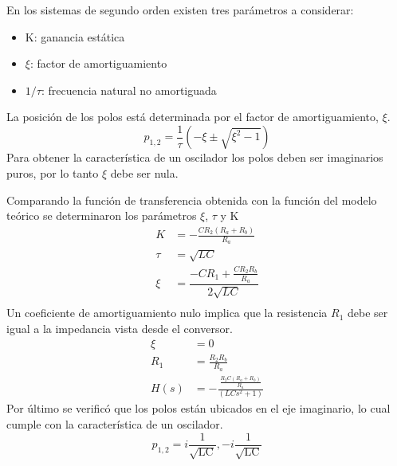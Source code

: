 \documentclass[10pt,a4paper]{article} %
\begin{document}
En los sistemas de segundo orden existen tres parámetros a considerar:
\begin{itemize} 
	\item K: ganancia estática
	\item $\xi$: factor de amortiguamiento
	\item $1/\tau$: frecuencia natural no amortiguada
\end{itemize}
La posición de los polos está determinada por el factor de amortiguamiento, $\xi$. 
\begin{equation*}
p_{1,2}=\frac{1}{\tau}\left(-\xi\pm\sqrt{\xi^2-1}\right)
\end{equation*}
Para obtener la característica de un oscilador los polos deben ser imaginarios puros, por lo tanto 
$\xi$ debe ser nula. 

Comparando la función de transferencia obtenida con la función del modelo teórico se determinaron los parámetros $\xi$, $\tau$ y K
\begin{align*}
K&=-\frac{CR_{2}(R_{a}+R_{b})}{R_{a}}\\
\tau&=\sqrt{LC}\\
\xi&=\dfrac{-CR_{1}+\frac{CR_{2}R_{b}}{R_{a}}}{2\sqrt{LC}}\\
\end{align*}
Un coeficiente de amortiguamiento nulo implica que la resistencia $R_{1}$ debe ser igual a la impedancia vista desde el conversor.
\begin{align*}
\xi&=0\\
R_{1}&=\frac{R_{2}R_{b}}{R_{a}}\\
H(s)&=-\frac{\frac{R_{2}C (R_{a}+R_{b})}{R_{a}}}{\left(LCs^2+1\right)}
\end{align*}
Por último se verificó que los polos están ubicados en el eje imaginario, lo cual cumple con la característica de un oscilador.
 \begin{equation*}
p_{1,2}=i\frac{1}{\sqrt{\text{L}\text{C}}},-i\frac{1}{\sqrt{\text{L}\text{C}}}
\end{equation*}
\end{document}
